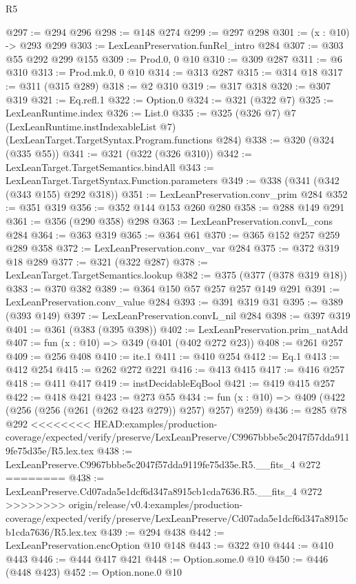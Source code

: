 \begin{lexlean}{R5}
\begin{coremodule}
{{{{{{{{{@297 := @294 @296
@298 := @148 @274
@299 := @297 @298
@301 := (x : @10) -> @293 @299
@303 := LexLeanPreservation.funRel_intro @284
@307 := @303 @55 @292 @299 @155
@309 := Prod.{0, 0} @10
@310 := @309 @287
@311 := @6 @310
@313 := Prod.mk.{0, 0} @10
@314 := @313 @287
@315 := @314 @18
@317 := @311 (@315 @289)
@318 := @2 @310
@319 := @317 @318
@320 := @307 @319
@321 := Eq.refl.{1}
@322 := Option.{0}
@324 := @321 (@322 @7)
@325 := LexLeanRuntime.index
@326 := List.{0}
@335 := @325
    (@326 @7)
    @7
    (LexLeanRuntime.instIndexableList @7)
    (LexLeanTarget.TargetSyntax.Program.functions @284)
@338 := @320 (@324 (@335 @55))
@341 := @321 (@322 (@326 @310))
@342 := LexLeanTarget.TargetSemantics.bindAll
@343 := LexLeanTarget.TargetSyntax.Function.parameters
@349 := @338 (@341 (@342 (@343 @155) @292 @318))
@351 := LexLeanPreservation.conv_prim @284
@352 := @351 @319
@356 := @352 @144 @153 @260 @280
@358 := @288 @149 @291
@361 := @356 (@290 @358) @298
@363 := LexLeanPreservation.convL_cons @284
@364 := @363 @319
@365 := @364 @61
@370 := @365 @152 @257 @259 @289 @358
@372 := LexLeanPreservation.conv_var @284
@375 := @372 @319 @18 @289
@377 := @321 (@322 @287)
@378 := LexLeanTarget.TargetSemantics.lookup
@382 := @375 (@377 (@378 @319 @18))
@383 := @370 @382
@389 := @364 @150 @57 @257 @257 @149 @291
@391 := LexLeanPreservation.conv_value @284
@393 := @391 @319 @31
@395 := @389 (@393 @149)
@397 := LexLeanPreservation.convL_nil @284
@398 := @397 @319
@401 := @361 (@383 (@395 @398))
@402 := LexLeanPreservation.prim_natAdd
@407 := fun (x : @10) => @349 (@401 (@402 @272 @23))
@408 := @261 @257
@409 := @256 @408
@410 := ite.{1}
@411 := @410 @254
@412 := Eq.{1}
@413 := @412 @254
@415 := @262 @272 @221
@416 := @413 @415
@417 := @416 @257
@418 := @411 @417
@419 := instDecidableEqBool
@421 := @419 @415 @257
@422 := @418 @421
@423 := @273 @55
@434 := fun (x : @10) => @409 (@422 (@256 (@256 (@261 (@262 @423 @279)) @257) @257) @259)
@436 := @285 @78 @292
<<<<<<<< HEAD:examples/production-coverage/expected/verify/preserve/LexLeanPreserve/C9967bbbe5c2047f57dda9119fe75d35e/R5.lex.tex
@438 := LexLeanPreserve.C9967bbbe5c2047f57dda9119fe75d35e.R5.__fits_4 @272
========
@438 := LexLeanPreserve.Cd07ada5e1dcf6d347a8915cb1cda7636.R5.__fits_4 @272
>>>>>>>> origin/release/v0.4:examples/production-coverage/expected/verify/preserve/LexLeanPreserve/Cd07ada5e1dcf6d347a8915cb1cda7636/R5.lex.tex
@439 := @294 @438
@442 := LexLeanPreservation.encOption @10 @148
@443 := @322 @10
@444 := @410 @443
@446 := @444 @417 @421
@448 := Option.some.{0} @10
@450 := @446 (@448 @423)
@452 := Option.none.{0} @10
}}}}}}}}}
\end{coremodule}
\end{lexlean}
